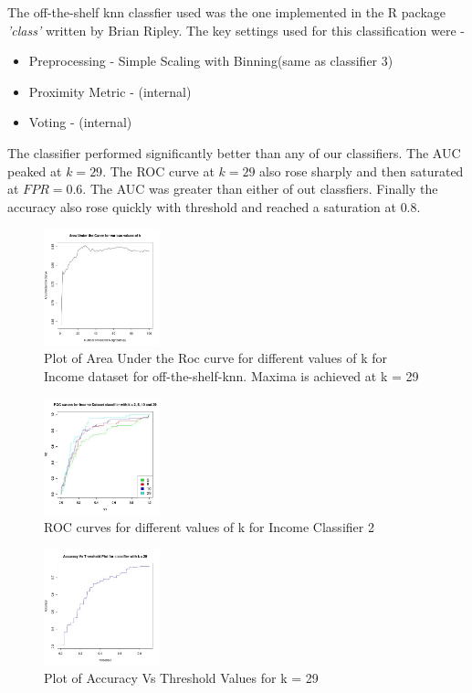 The off-the-shelf knn classfier used was the one implemented in the R package \emph{'class'} written by Brian Ripley. The key settings used for this classification were - 
\begin{itemize}
		\item Preprocessing - Simple Scaling with Binning(same as classifier 3)
		\item Proximity Metric - (internal)
		\item Voting - (internal)
\end{itemize}
The classifier performed significantly better than any of our classifiers. The AUC peaked at $k=29$. The ROC curve at $k=29$ also rose sharply and then saturated at $FPR=0.6$. The AUC was greater than either of out classfiers. Finally the accuracy also rose quickly with threshold and reached a saturation at $0.8$.\\

\begin{figure}[h]
	\label{fig:classifier2_auc}
	\caption{Plot of Area Under the Roc curve for different values of k for Income dataset for off-the-shelf-knn. Maxima is achieved at k = 29}
	\centering
	\includegraphics[width=0.3\textwidth]{images/native-knn/auc.jpg}
\end{figure}	
\begin{figure}
	\label{fig:classifier2_roc}
	\caption{ROC curves for different values of k for Income Classifier 2}
	\centering
	\includegraphics[width=0.3\textwidth]{images/native-knn/roc.jpg}
\end{figure}
\begin{figure}
	\label{fig:classifier2_accuracy}
	\caption{Plot of Accuracy Vs Threshold Values for k = 29}
	\centering
	\includegraphics[width=0.3\textwidth]{images/native-knn/accuracy.jpg}
\end{figure}

